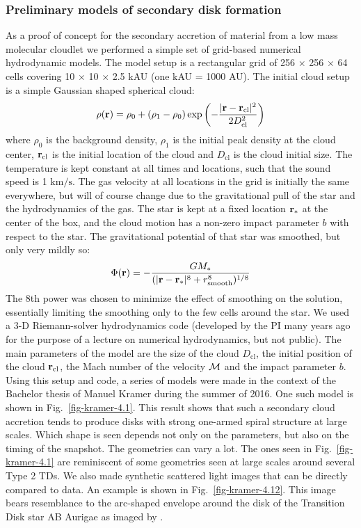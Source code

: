 \documentclass[10pt,fleqn,twoside,a4paper]{article}
\begin{document}
\subsubsection{Preliminary models of secondary disk formation}
As a proof of concept for the secondary accretion of material from a low
mass molecular cloudlet we performed a simple set of grid-based numerical
hydrodynamic models. The model setup is a rectangular grid of 256 $\times$
256 $\times$ 64 cells covering 10 $\times$ 10 $\times$ 2.5 kAU (one kAU =
1000 AU). The initial cloud setup is a simple Gaussian shaped spherical
cloud:
\begin{equation}
\rho({\bf r}) = \rho_0 + (\rho_1-\rho_0)\exp\left(-\frac{|{\bf r}-{\bf r}_{\mathrm{cl}}|^2}{2D^2_{\mathrm{cl}}}\right)
\end{equation}
where $\rho_0$ is the background density, $\rho_1$ is the initial peak
density at the cloud center, ${\bf r}_{\mathrm{cl}}$ is the initial location
of the cloud and $D_{\mathrm{cl}}$ is the cloud initial size. The
temperature is kept constant at all times and locations, such that the sound
speed is 1 $\mathrm{km}/\mathrm{s}$. The gas velocity at all locations in
the grid is initially the same everywhere, but will of course change due to
the gravitational pull of the star and the hydrodynamics of the gas. The
star is kept at a fixed location ${\bf r}_{*}$ at the center of the box, and
the cloud motion has a non-zero impact parameter $b$ with respect to the
star. The gravitational potential of that star was smoothed, but only very
mildly so:
\begin{equation}
  \Phi({\bf r}) = -\frac{GM_{*}}{(|{\bf r}-{\bf r}_{*}|^8+r_{\mathrm{smooth}}^8)^{1/8}}
\end{equation}
The 8th power was chosen to minimize the effect of smoothing on the
solution, essentially limiting the smoothing only to the few cells around
the star. We used a 3-D Riemann-solver hydrodynamics code (developed by the
PI many years ago for the purpose of a lecture on numerical hydrodynamics,
but not public). The main parameters of the model are the size of the cloud
$D_{\mathrm{cl}}$, the initial position of the cloud ${\bf
  r}_{\mathrm{cl}}$, the Mach number of the velocity ${\cal M}$ and the
impact parameter $b$. Using this setup and code, a series of models were
made in the context of the Bachelor thesis of Manuel Kramer during the
summer of 2016. One such model is shown in Fig.~\ref{fig-kramer-4.1}.  This
result shows that such a secondary cloud accretion tends to produce disks
with strong one-armed spiral structure at large scales. Which shape is seen
depends not only on the parameters, but also on the timing of the snapshot.
The geometries can vary a lot. The ones seen in Fig.~\ref{fig-kramer-4.1}
are reminiscent of some geometries seen at large scales around several Type
2 TDs. We also made synthetic scattered light images that can be directly
compared to data. An example is shown in Fig.~\ref{fig-kramer-4.12}. This
image bears resemblance to the arc-shaped envelope around the disk of the
Transition Disk star AB Aurigae as imaged by \citet{1999ApJ...523L.151G}.
\end{document}
